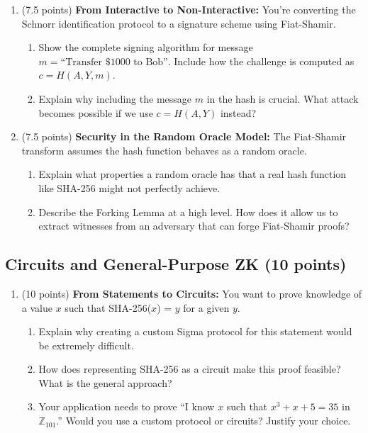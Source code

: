 \documentclass[10pt,a4paper,american]{article}
\begin{document}
\begin{enumerate}
	\item (7.5 points) \textbf{From Interactive to Non-Interactive:}
	      You're converting the Schnorr identification protocol to a signature scheme using Fiat-Shamir.
	      \begin{enumerate}
		      \item Show the complete signing algorithm for message $m = \text{``Transfer \$1000 to Bob''}$. Include how the challenge is computed as $c = H(A, Y, m)$.
		      \item Explain why including the message $m$ in the hash is crucial. What attack becomes possible if we use $c = H(A, Y)$ instead?
	      \end{enumerate}
	\item (7.5 points) \textbf{Security in the Random Oracle Model:}
	      The Fiat-Shamir transform assumes the hash function behaves as a random oracle.
	      \begin{enumerate}
		      \item Explain what properties a random oracle has that a real hash function like SHA-256 might not perfectly achieve.
		      \item Describe the Forking Lemma at a high level. How does it allow us to extract witnesses from an adversary that can forge Fiat-Shamir proofs?
	      \end{enumerate}
\end{enumerate}

\subsection{Circuits and General-Purpose ZK (10 points)}

\begin{enumerate}
	\item (10 points) \textbf{From Statements to Circuits:}
	      You want to prove knowledge of a value $x$ such that SHA-256($x$) = $y$ for a given $y$.
	      \begin{enumerate}
		      \item Explain why creating a custom Sigma protocol for this statement would be extremely difficult.
		      \item How does representing SHA-256 as a circuit make this proof feasible? What is the general approach?
		      \item Your application needs to prove ``I know $x$ such that $x^3 + x + 5 = 35$ in $\mathbb{Z}_{101}$.'' Would you use a custom protocol or circuits? Justify your choice.
	      \end{enumerate}
\end{enumerate}
\end{document}
